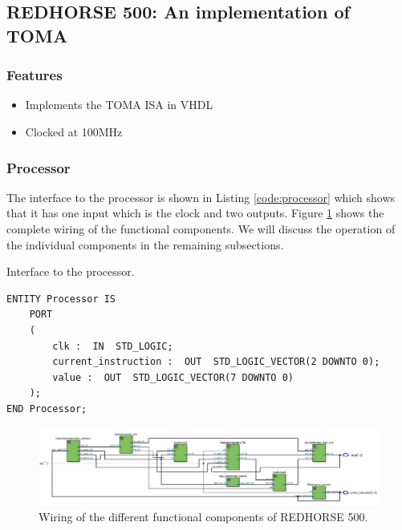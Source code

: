 \documentclass[a4paper, 11pt,oneside]{article}
\begin{document}
\subsection{REDHORSE 500: An implementation of TOMA}

\subsubsection{Features}
\begin{itemize}
\item Implements the TOMA ISA in VHDL
\item Clocked at 100MHz
\end{itemize}

\subsubsection{Processor}
The interface to the processor is shown in Listing \ref{code:processor} which 
shows that it has one input which is the clock and two outputs. Figure 
\ref{fig:redhorse500} shows the complete wiring of the functional components. 
We will discuss the operation of the individual components in the remaining 
subsections. 

\begin{listing}[H]
\caption{Interface to the processor.}
\label{code:processor}
\begin{verbatim}
ENTITY Processor IS 
    PORT
    (
        clk :  IN  STD_LOGIC;
        current_instruction :  OUT  STD_LOGIC_VECTOR(2 DOWNTO 0);
        value :  OUT  STD_LOGIC_VECTOR(7 DOWNTO 0)
    );
END Processor;
\end{verbatim}
\end{listing}

\begin{landscape}
\thispagestyle{plain}
\begin{figure}[H]
	\begin{center}
	\includegraphics[width=10.5in]{redhorse500.png}
	\caption{Wiring of the different functional components of REDHORSE 500.}
	\label{fig:redhorse500} 
	\end{center}
\end{figure}
\end{landscape}
\end{document}
